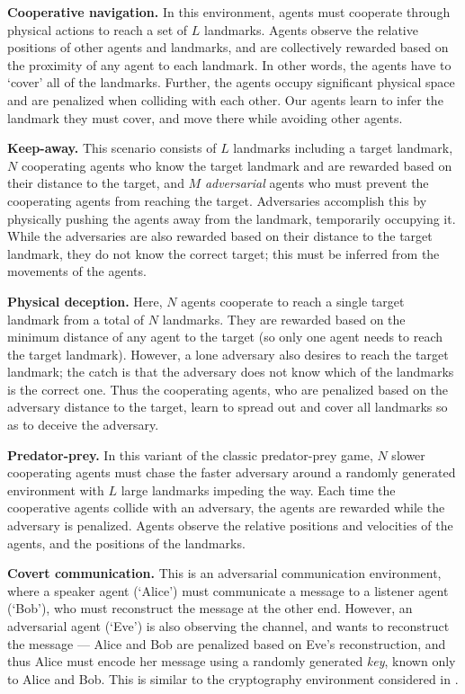 \documentclass{article}
\begin{document}
\textbf{Cooperative navigation.} In this environment, agents must cooperate through physical actions to reach a set of $L$ landmarks. Agents observe the relative positions of other agents and landmarks, and are collectively rewarded based on the proximity of any agent to each landmark. In other words, the agents have to `cover' all of the landmarks. Further, the agents occupy significant physical space and are penalized when colliding with each other. Our agents learn to infer the landmark they must cover, and move there while avoiding other agents. %

\textbf{Keep-away.} This scenario consists of $L$ landmarks including a target landmark, $N$ cooperating agents who know the target landmark and are rewarded based on their distance to the target, and $M$ \textit{adversarial} agents who must prevent the cooperating agents from reaching the target.  Adversaries accomplish this by physically pushing the agents away from the landmark, temporarily occupying it. While the adversaries are also rewarded based on their distance to the target landmark, they do not know the correct target; this must be inferred from the movements of the agents. %

\textbf{Physical deception.} Here, $N$ agents cooperate to reach a single target landmark from a total of $N$ landmarks. They are rewarded based on the minimum distance of any agent to the target (so only one agent needs to reach the target landmark). However, a lone adversary also desires to reach the target landmark; the catch is that the adversary does not know which of the landmarks is the correct one. Thus the cooperating agents, who are penalized based on the adversary distance to the target, learn to spread out and cover all landmarks so as to deceive the adversary.

\textbf{Predator-prey.} In this variant of the classic predator-prey game, $N$ slower cooperating agents must chase the faster adversary around a randomly generated environment with $L$ large landmarks impeding the way. Each time the cooperative agents collide with an adversary, the agents are rewarded while the adversary is penalized. Agents observe the relative positions and velocities of the agents, and the positions of the landmarks.

\textbf{Covert communication.} This is an adversarial communication environment, where a speaker agent (`Alice') must communicate a message to a listener agent (`Bob'), who must reconstruct the message at the other end. However, an adversarial agent (`Eve') is also observing the channel, and wants to reconstruct the message --- Alice and Bob are penalized based on Eve's reconstruction, and thus Alice must encode her message using a randomly generated \textit{key}, known only to Alice and Bob. This is similar to the cryptography environment considered in \cite{abadi2016learning}.
\end{document}
